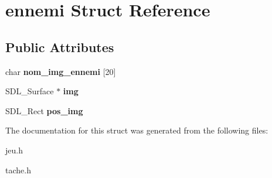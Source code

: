 \hypertarget{structennemi}{}\section{ennemi Struct Reference}
\label{structennemi}
\subsection*{Public Attributes}
\begin{DoxyCompactItemize}
\item 
\mbox{\label{structennemi_a9c6e9854108633c17e4f5b59b40651f1}} 
char {\bfseries nom\+\_\+img\+\_\+ennemi} \mbox{[}20\mbox{]}
\item 
\mbox{\label{structennemi_abfee19c563375cba40bc7f1b9c087aba}} 
S\+D\+L\+\_\+\+Surface $\ast$ {\bfseries img}
\item 
\mbox{\label{structennemi_ac621d9b544f48caac733c6021e76c88c}} 
S\+D\+L\+\_\+\+Rect {\bfseries pos\+\_\+img}
\end{DoxyCompactItemize}


The documentation for this struct was generated from the following files\+:\begin{DoxyCompactItemize}
\item 
jeu.\+h\item 
tache.\+h\end{DoxyCompactItemize}
